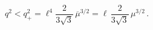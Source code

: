 \begin{equation}q^2<q_+^2=\ell^4\frac{2}{3\sqrt{3}}\,\overline{\mu}^{3/2}=
\ell\,\frac{2}{3\sqrt{3}}\,\mu^{3/2}\,.\end{equation}

